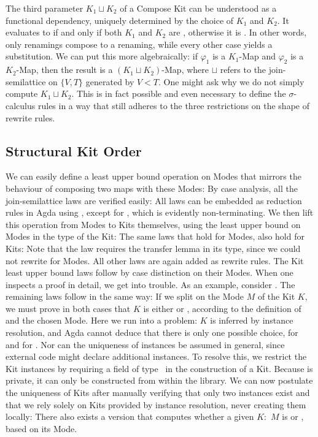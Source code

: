 \documentclass[screen,nonacm]{acmart}
\begin{document}
The third parameter $K_1 \sqcup K_2$ of a Compose Kit can be understood as a
functional dependency, uniquely determined by the choice of $K_1$ and $K_2$. It
evaluates to  if and only if both $K_1$ and $K_2$ are
, otherwise it is . In other words, only
renamings compose to a renaming, while every other case yields a substitution.
We can put this more algebraically: if $\varphi_1$ is a $K_1$-Map and
$\varphi_2$ is a $K_2$-Map, then the result is a $(K_1 \sqcup K_2)$-Map, where
$\sqcup$ refers to the join-semilattice on $\{V, T\}$ generated by $V < T$. One
might ask why we do not simply compute $K_1 \sqcup K_2$. This is in fact
possible and even necessary to define the $\sigma$-calculus rules in a way that
still adheres to the three restrictions on the shape of rewrite rules.

\subsection{Structural Kit Order}\label{sec:ags-sko}
We can easily define a least upper bound operation on Modes that mirrors the
behaviour of composing two maps with these Modes: \AModeLub{}By case analysis,
all the join-semilattice laws are verified easily: \AModeLubLaws{}All laws can
be embedded as reduction rules in Agda using , except for
, which is evidently non-terminating. We then lift this
operation from Modes to Kits themselves, using the least upper bound on Modes
in the type of the Kit: \AKitLub{}The same laws that hold for Modes, also hold
for Kits: \AKitLubLaws{}Note that the  law requires the
transfer lemma in its type, since we could not rewrite 
for Modes. All other laws are again added as rewrite rules. The Kit least upper
bound laws follow by case distinction on their Modes. When one inspects a proof
in detail, we get into trouble. As an example, consider .
The remaining laws follow in the same way: \AKitLubExcerpt{}If we split on the
Mode $M$ of the Kit $K$, we must prove in both cases that $K$ is either
 or , according to the definition of
 and the chosen Mode. Here we run into a problem: $K$ is
inferred by instance resolution, and Agda cannot deduce that there is only one
possible choice,  for  and
 for . Nor can the uniqueness of
instances be assumed in general, since external code might declare additional
instances. To resolve this, we restrict the Kit instances by requiring a field
\ALockField{} of type \ALock \ in the construction of a Kit. Because
 is private, it can only be constructed from within the
library. We can now postulate the uniqueness of Kits after manually verifying
that only two instances exist and that we rely solely on Kits provided by
instance resolution, never creating them locally: \AUniqueKits{}There also
exists a version  that computes whether a given $K : $
 $M$ is  or , based on its
Mode.
\end{document}
